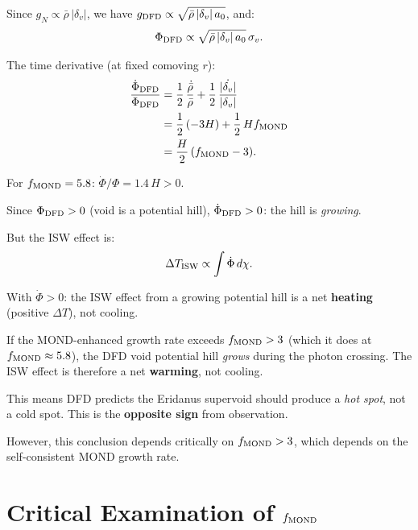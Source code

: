 \documentclass[11pt,a4paper]{article}
\newcommand{\aM}{a_0}
\newcounter{findingctr}
\newenvironment{finding}[1][]{%
  \refstepcounter{findingctr}%
  \begin{tcolorbox}[colback=blue!3!white, colframe=blue!50!black,
    title=\textbf{Finding \thefindingctr: #1}]
}{%
  \end{tcolorbox}%
}
\begin{document}
Since $g_N \propto \bar{\rho}\,|\delta_v|$, we have
$g_{\rm DFD} \propto \sqrt{\bar{\rho}\,|\delta_v|\,\aM}$, and:
\begin{equation}
\Phi_{\rm DFD} \propto \sqrt{\bar{\rho}\,|\delta_v|\,\aM}\,\sigma_v.
\end{equation}

The time derivative (at fixed comoving $r$):
\begin{align}
\frac{\dot{\Phi}_{\rm DFD}}{\Phi_{\rm DFD}}
&= \frac{1}{2}\,\frac{\dot{\bar{\rho}}}{\bar{\rho}}
+ \frac{1}{2}\,\frac{\dot{|\delta_v|}}{|\delta_v|}
\nonumber\\
&= \frac{1}{2}\,(-3H) + \frac{1}{2}\,Hf_{\rm MOND}
\nonumber\\
&= \frac{H}{2}\,(f_{\rm MOND} - 3).
\label{eq:Phi-dot-check}
\end{align}

For $f_{\rm MOND} = 5.8$: $\dot{\Phi}/\Phi = 1.4\,H > 0$.

Since $\Phi_{\rm DFD} > 0$ (void is a potential hill),
$\dot{\Phi}_{\rm DFD} > 0$: the hill is \emph{growing}.

But the ISW effect is:
\begin{equation}
\Delta T_{\rm ISW} \propto \int \dot{\Phi}\,d\chi.
\end{equation}

With $\dot{\Phi} > 0$: the ISW effect from a growing potential hill
is a net \textbf{heating} (positive $\Delta T$), not cooling.

\begin{finding}[DFD Predicts ISW Warming from Voids, Not Cooling]
\label{find:warming}
If the MOND-enhanced growth rate exceeds $f_{\rm MOND} > 3$ (which
it does at $f_{\rm MOND} \approx 5.8$), the DFD void potential hill
\emph{grows} during the photon crossing. The ISW effect is therefore
a net \textbf{warming}, not cooling.

This means DFD predicts the Eridanus supervoid should produce a
\emph{hot spot}, not a cold spot. This is the \textbf{opposite sign}
from observation.

However, this conclusion depends critically on $f_{\rm MOND} > 3$,
which depends on the self-consistent MOND growth rate.
\end{finding}


\section{Critical Examination of $f_{\rm MOND}$}
\label{sec:f-MOND-critical}
\end{document}
